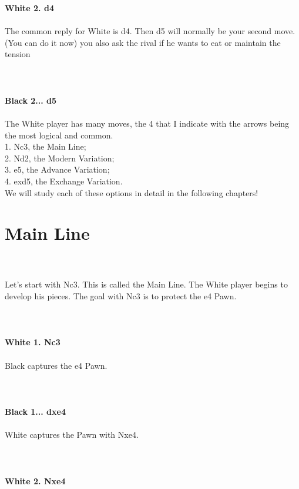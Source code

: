 \documentclass{article}
\begin{document}
\textbf{White 2. d4}\\
\\
The common reply for White is d4. Then d5 will normally be your second move. (You can do it now) you also ask the rival if he wants to eat or maintain the tension\\
\\

\\
\\
\textbf{Black 2... d5}\\
\\
The White player has many moves, the 4 that I indicate with the arrows being the most logical and common.\\1. Nc3, the Main Line;\\2. Nd2, the Modern Variation;\\3. e5, the Advance Variation;\\4. exd5, the Exchange Variation.\\We will study each of these options in detail in the following chapters! \section{ Main Line}

\\
\\
Let's start with Nc3. This is called the Main Line. The White player begins to develop his pieces. The goal with Nc3 is to protect the e4 Pawn. \\
\\

\\
\\
\textbf{White 1. Nc3}\\
\\
Black captures the e4 Pawn. \\
\\

\\
\\
\textbf{Black 1... dxe4}\\
\\
White captures the Pawn with Nxe4.\\
\\

\\
\\
\textbf{White 2. Nxe4}\\
\end{document}

